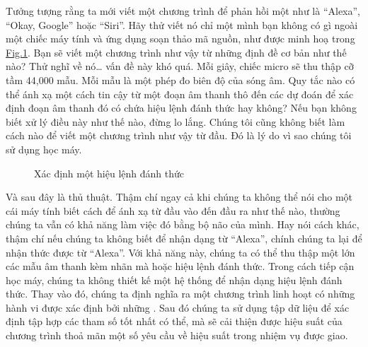 \documentclass[letterpaper,11pt,english]{sphinxmanual}
\begin{document}
Tưởng tượng rằng ta mới viết một chương trình để phản hồi một  như là “Alexa”, “Okay, Google” hoặc “Siri”. Hãy thử viết nó
chỉ một mình bạn không có gì ngoài một chiếc máy tính và ứng dụng soạn
thảo mã nguồn, như được minh hoạ trong \hyperref[\detokenize{chapter_introduction/index_vn:fig-wake-word}]{Fig.\@ \ref{\detokenize{chapter_introduction/index_vn:fig-wake-word}}}. Bạn sẽ
viết một chương trình như vậy từ những định đề cơ bản như thế nào? Thử
nghĩ về nó… vấn đề này khó quá. Mỗi giây, chiếc micro sẽ thu thập cỡ tầm
44,000 mẫu. Mỗi mẫu là một phép đo biên độ của sóng âm. Quy tắc nào có
thể ánh xạ một cách tin cậy từ một đoạn âm thanh thô đến các dự đoán
 để xác định đoạn âm thanh đó có chứa hiệu lệnh đánh thức
hay không? Nếu bạn không biết xử lý điều này như thế nào, đừng lo lắng.
Chúng tôi cũng không biết làm cách nào để viết một chương trình như vậy
từ đầu. Đó là lý do vì sao chúng tôi sử dụng học máy.



\begin{figure}[H]
\centering
\capstart

\noindent{}
\caption{Xác định một hiệu lệnh đánh thức}\label{\detokenize{chapter_introduction/index_vn:id9}}\label{\detokenize{chapter_introduction/index_vn:fig-wake-word}}\end{figure}



Và sau đây là thủ thuật. Thậm chí ngay cả khi chúng ta không thể nói cho
một cái máy tính biết cách để ánh xạ từ đầu vào đến đầu ra như thế nào,
thường chúng ta vẫn có khả năng làm việc đó bằng bộ não của mình. Hay
nói cách khác, thậm chí nếu chúng ta không biết  để nhận dạng từ “Alexa”, chính chúng ta lại  để
nhận thức được từ “Alexa”. Với khả năng này, chúng ta có thể thu thập
một  lớn các mẫu âm thanh kèm nhãn mà  hoặc  hiệu lệnh đánh thức. Trong cách tiếp cận học máy, chúng ta
không thiết kế một hệ thống  để nhận dạng hiệu lệnh đánh thức.
Thay vào đó, chúng ta định nghĩa ra một chương trình linh hoạt có những
hành vi được xác định bởi những . Sau đó chúng ta sử dụng tập
dữ liệu để xác định tập hợp các tham số tốt nhất có thể, mà sẽ cải thiện
được hiệu suất của chương trình thoả mãn một số yêu cầu về hiệu suất
trong nhiệm vụ được giao.
\end{document}
